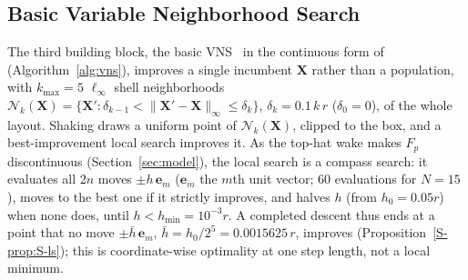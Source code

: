 \subsection{Basic Variable Neighborhood Search}
\label{sec:vns}
The third building block, the basic VNS~\cite{Mladenovic1997,Hansen2001} in the continuous form of~\cite{Mladenovic2008} (Algorithm~\ref{alg:vns}), improves a single incumbent $\mathbf X$ rather than a population, with $k_{\max}=5$ $\ell_\infty$ shell neighborhoods $\mathcal N_k(\mathbf X)=\{\mathbf X':\delta_{k-1}<\lVert \mathbf X'-\mathbf X\rVert_\infty\le\delta_k\}$, $\delta_k=0.1\,k\,r$ ($\delta_0=0$), of the whole layout. Shaking draws a uniform point of $\mathcal N_k(\mathbf X)$, clipped to the box, and a best-improvement local search improves it. As the top-hat wake makes $F_p$ discontinuous (Section~\ref{sec:model}), the local search is a compass search: it evaluates all $2n$ moves $\pm h\,\mathbf e_m$ ($\mathbf e_m$ the $m$th unit vector; 60 evaluations for $N=15$), moves to the best one if it strictly improves, and halves $h$ (from $h_0=0.05r$) when none does, until $h<h_{\min}=10^{-3}r$. A completed descent thus ends at a point that no move $\pm\bar h\,\mathbf e_m$, $\bar h=h_0/2^5=0.0015625\,r$, improves (Proposition~\ref{S-prop:S-ls}); this is coordinate-wise optimality at one step length, not a local minimum.

